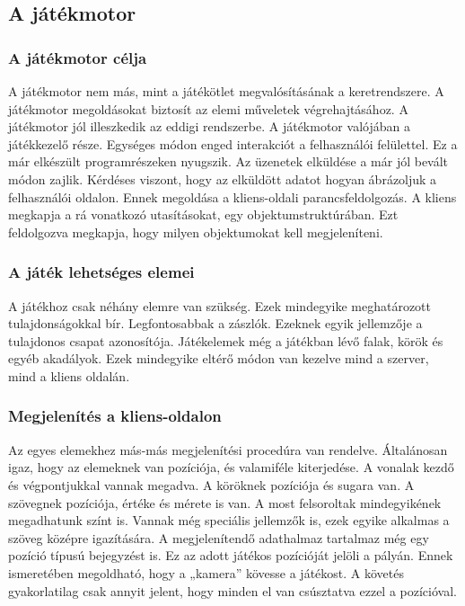 \documentclass[bibliography=totocnumbered]{article}
\begin{document}
\subsection{A játékmotor}


\subsubsection{A játékmotor célja}

A játékmotor nem más, mint a játékötlet megvalósításának a
keretrendszere. A játékmotor megoldásokat biztosít az elemi műveletek
végrehajtásához. A játékmotor jól illeszkedik az eddigi rendszerbe. A
játékmotor valójában a játékkezelő része. Egységes módon enged
interakciót a felhasználói felülettel. Ez a már elkészült
programrészeken nyugszik. Az üzenetek elküldése a már jól bevált módon
zajlik. Kérdéses viszont, hogy az elküldött adatot hogyan ábrázoljuk a
felhasználói oldalon. Ennek megoldása a kliens-oldali
parancsfeldolgozás. A kliens megkapja a rá vonatkozó utasításokat, egy
objektumstruktúrában. Ezt feldolgozva megkapja, hogy milyen objektumokat
kell megjeleníteni.


\subsubsection{A játék lehetséges
elemei}

A játékhoz csak néhány elemre van szükség. Ezek mindegyike meghatározott
tulajdonságokkal bír. Legfontosabbak a zászlók. Ezeknek egyik jellemzője
a tulajdonos csapat azonosítója. Játékelemek még a játékban lévő falak,
körök és egyéb akadályok. Ezek mindegyike eltérő módon van kezelve mind
a szerver, mind a kliens oldalán.


\subsubsection{Megjelenítés a
kliens-oldalon}

Az egyes elemekhez más-más megjelenítési procedúra van rendelve.
Általánosan igaz, hogy az elemeknek van pozíciója, és valamiféle
kiterjedése. A vonalak kezdő és végpontjukkal vannak megadva. A köröknek
pozíciója és sugara van. A szövegnek pozíciója, értéke és mérete is van.
A most felsoroltak mindegyikének megadhatunk színt is. Vannak még
speciális jellemzők is, ezek egyike alkalmas a szöveg középre
igazítására. A megjelenítendő adathalmaz tartalmaz még egy pozíció
típusú bejegyzést is. Ez az adott játékos pozícióját jelöli a pályán.
Ennek ismeretében megoldható, hogy a „kamera'' kövesse a játékost. A
követés gyakorlatilag csak annyit jelent, hogy minden el van csúsztatva
ezzel a pozícióval.
\end{document}
